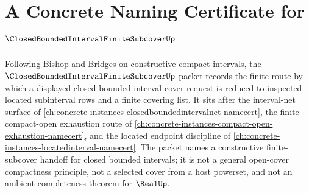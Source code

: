\chapter{A Concrete Naming Certificate for $\ClosedBoundedIntervalFiniteSubcoverUp$}
\label{ch:concrete-instances-closed-bounded-interval-finite-subcover-namecert}

Following Bishop and Bridges on constructive compact intervals, the $\ClosedBoundedIntervalFiniteSubcoverUp$ packet records the finite route by which a displayed closed bounded interval cover request is reduced to inspected located subinterval rows and a finite covering list. It sits after the interval-net surface of \autoref{ch:concrete-instances-closedboundedintervalnet-namecert}, the finite compact-open exhaustion route of \autoref{ch:concrete-instances-compact-open-exhaustion-namecert}, and the located endpoint discipline of \autoref{ch:concrete-instances-locatedinterval-namecert}. The packet names a constructive finite-subcover handoff for closed bounded intervals; it is not a general open-cover compactness principle, not a selected cover from a host powerset, and not an ambient completeness theorem for $\RealUp$.

